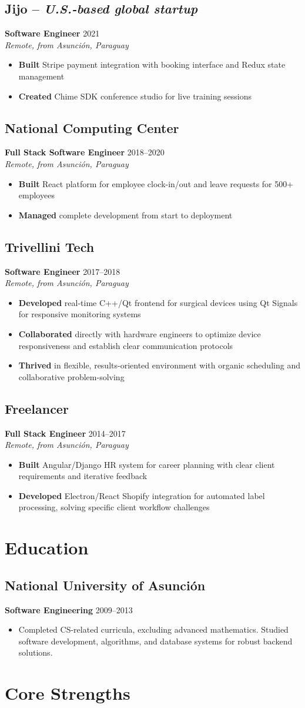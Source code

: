 \documentclass[11pt,a4paper]{article}
\newcommand{\actionverb}[1]{\textcolor{actioncolor}{\textbf{#1}}}
\newcommand{\cvcompany}[3]{
  \subsection{#1 \textcolor{mediumgray}{#2}}
  #3
  \vspace{0.5em}
}
\newcommand{\cvrole}[4]{
  \textbf{#1} \hfill \textcolor{mediumgray}{\small #2}\\
  \textit{#3}
  \begin{itemize}
    #4
  \end{itemize}
  \vspace{1em}
}
\newcommand{\cveducation}[4]{
  \subsection{#1}
  \textbf{#2} \hfill \textcolor{mediumgray}{\small #3}
  \begin{itemize}
    \item #4
  \end{itemize}
}
\begin{document}
\cvcompany{Jijo}{-- \textit{U.S.-based global startup}}{
  \cvrole{Software Engineer}{2021}{Remote, from Asunción, Paraguay}{
    \item \actionverb{Built} Stripe payment integration with booking interface and Redux state management
    \item \actionverb{Created} Chime SDK conference studio for live training sessions
  }
}

\cvcompany{National Computing Center}{}{
  \cvrole{Full Stack Software Engineer}{2018--2020}{Remote, from Asunción, Paraguay}{
    \item \actionverb{Built} React platform for employee clock-in/out and leave requests for 500+ employees
    \item \actionverb{Managed} complete development from start to deployment
  }
}

\cvcompany{Trivellini Tech}{}{
  \cvrole{Software Engineer}{2017--2018}{Remote, from Asunción, Paraguay}{
    \item \actionverb{Developed} real-time C++/Qt frontend for surgical devices using Qt Signals for responsive monitoring systems
    \item \actionverb{Collaborated} directly with hardware engineers to optimize device responsiveness and establish clear communication protocols
    \item \actionverb{Thrived} in flexible, results-oriented environment with organic scheduling and collaborative problem-solving
  }
}

\cvcompany{Freelancer}{}{
  \cvrole{Full Stack Engineer}{2014--2017}{Remote, from Asunción, Paraguay}{
    \item \actionverb{Built} Angular/Django HR system for career planning with clear client requirements and iterative feedback
    \item \actionverb{Developed} Electron/React Shopify integration for automated label processing, solving specific client workflow challenges
  }
}

\section{Education}

\cveducation{National University of Asunción}{Software Engineering}{2009--2013}{Completed CS-related curricula, excluding advanced mathematics. Studied software development, algorithms, and database systems for robust backend solutions.}

\section{Core Strengths}
\end{document}
